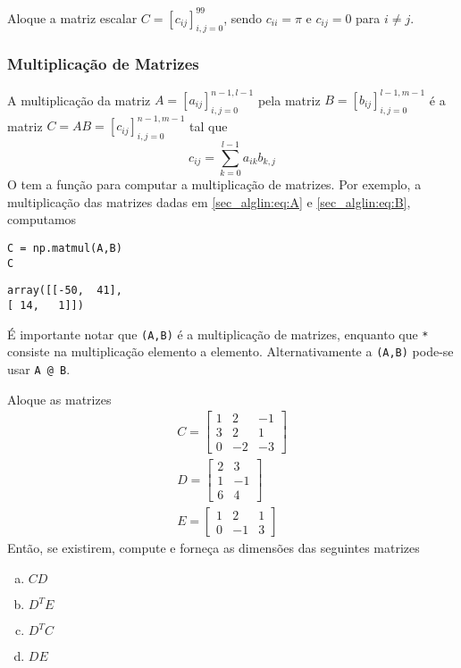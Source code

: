  \begin{exr}
   Aloque a matriz escalar $C = [c_{ij}]_{i,j=0}^{99}$, sendo $c_{ii}=\pi$ e $c_{ij}=0$ para $i\neq j$.
 \end{exr}

\subsubsection{Multiplicação de Matrizes}

A multiplicação da matriz $A = [a_{ij}]_{i,j=0}^{n-1,l-1}$ pela matriz $B = [b_{ij}]_{i,j=0}^{l-1,m-1}$ é a matriz $C = AB = [c_{ij}]_{i,j=0}^{n-1,m-1}$ tal que
\begin{equation}
  c_{ij} = \sum_{k=0}^{l-1} a_{ik}b_{k,j}
\end{equation}
O {\PYTHONnumpy} tem a função {\PYTHONnumpyDOTmatmul} para computar a multiplicação de matrizes. Por exemplo, a multiplicação das matrizes dadas em \eqref{sec_alglin:eq:A} e \eqref{sec_alglin:eq:B}, computamos

\begin{lstlisting}
C = np.matmul(A,B)
C
\end{lstlisting}

\begin{verbatim}
array([[-50,  41],
[ 14,   1]])
\end{verbatim}

\begin{obs}
  É importante notar que {\PYTHONnumpyDOTmatmul}\texttt{(A,B)} é a multiplicação de matrizes, enquanto que \texttt{*} consiste na multiplicação elemento a elemento. Alternativamente a {\PYTHONnumpyDOTmatmul}\texttt{(A,B)} pode-se usar \texttt{A @ B}.
\end{obs}

\begin{exr}
  Aloque as matrizes
  \begin{gather}
    C =
    \begin{bmatrix}
      1 & 2 & -1 \\
      3 & 2 & 1 \\
      0 & -2 & -3
    \end{bmatrix}\\
    D =
    \begin{bmatrix}
      2 & 3 \\
      1 & -1 \\
      6 & 4
    \end{bmatrix}\\
    E =
    \begin{bmatrix}
      1 & 2 & 1 \\
      0 & -1 & 3
    \end{bmatrix}
  \end{gather}
  Então, se existirem, compute e forneça as dimensões das seguintes matrizes
  \begin{enumerate}[a)]
  \item $CD$
  \item $D^TE$
  \item $D^TC$
  \item $DE$
  \end{enumerate}
\end{exr}

